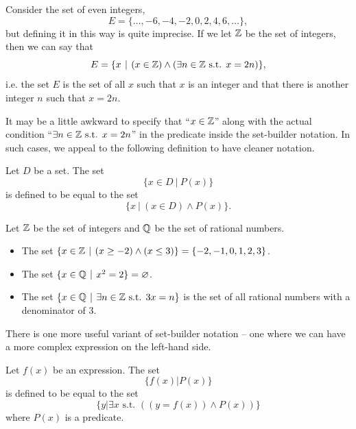 \begin{example}
    Consider the set of even integers,
    \[
        E = \{\dots, -6, -4, -2, 0, 2, 4, 6, \dots\},
    \]
    but defining it in this way is quite imprecise. If we let $\mathbb{Z}$ be the set of integers, then we can say that
    \[
        E = \{x \vert (x \in \Z) \land (\exists n \in \Z \text{ s.t. } x = 2n)\},
    \]
    i.e. the set $E$ is the set of all $x$ such that $x$ is an integer and that there is another integer $n$ such that $x = 2n$.
\end{example}

It may be a little awkward to specify that ``$x \in \mathbb{Z}$'' along with the actual condition ``$\exists n \in \mathbb{Z} \text{ s.t. } x = 2n$'' in the predicate inside the set-builder notation. In such cases, we appeal to the following definition to have cleaner notation.

\begin{definition}
    Let $D$ be a set. The set
    \[
        \{x \in D \ | \ P(x)\}
    \]
    is defined to be equal to the set
    \[
        \{x \ | \ (x \in D) \land P(x)\}.
    \]
\end{definition}

\begin{example}
    Let $\mathbb{Z}$ be the set of integers and $\mathbb{Q}$ be the set of rational numbers.
    \begin{itemize}
        \item The set $\{x \in \Z \vert (x \geq -2) \land (x \leq 3)\} = \{-2, -1, 0, 1, 2, 3\}$.
        \item The set $\{x \in \Q \vert x^2 = 2\} = \emptyset$.
        \item The set $\{x \in \Q \vert \exists n \in \Z \text{ s.t. } 3x = n\}$ is the set of all rational numbers with a denominator of 3.
    \end{itemize}
\end{example}

There is one more useful variant of set-builder notation -- one where we can have a more complex expression on the left-hand side.

\begin{definition}
    Let $f(x)$ be an expression. The set
    \[
        \{f(x) \vert P(x)\}
    \]
    is defined to be equal to the set
    \[
        \{y \vert \exists x \text{ s.t. } ((y = f(x)) \land P(x))\}
    \]
    where $P(x)$ is a predicate.
\end{definition}

